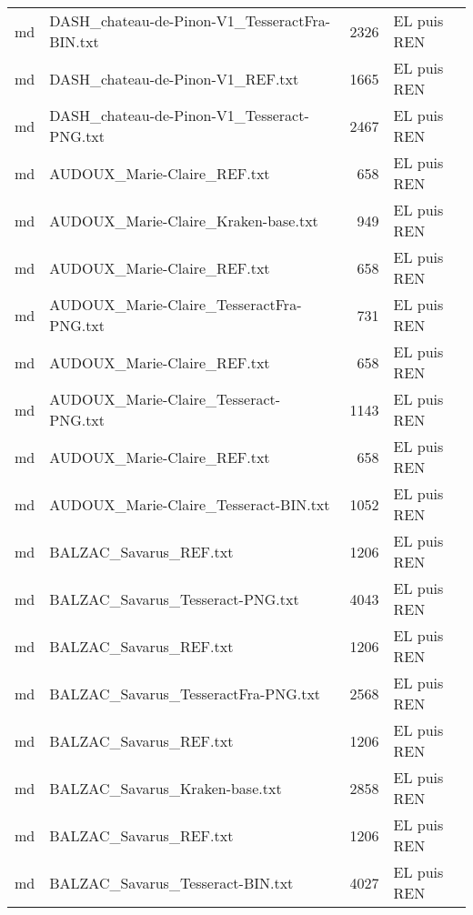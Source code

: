 \begin{tabular}{llrl}
    md &      DASH\_chateau-de-Pinon-V1\_TesseractFra-BIN.txt &                  2326 & EL puis REN \\
    md &                   DASH\_chateau-de-Pinon-V1\_REF.txt &                  1665 & EL puis REN \\
    md &         DASH\_chateau-de-Pinon-V1\_Tesseract-PNG.txt &                  2467 & EL puis REN \\
    md &                        AUDOUX\_Marie-Claire\_REF.txt &                   658 & EL puis REN \\
    md &                AUDOUX\_Marie-Claire\_Kraken-base.txt &                   949 & EL puis REN \\
    md &                        AUDOUX\_Marie-Claire\_REF.txt &                   658 & EL puis REN \\
    md &           AUDOUX\_Marie-Claire\_TesseractFra-PNG.txt &                   731 & EL puis REN \\
    md &                        AUDOUX\_Marie-Claire\_REF.txt &                   658 & EL puis REN \\
    md &              AUDOUX\_Marie-Claire\_Tesseract-PNG.txt &                  1143 & EL puis REN \\
    md &                        AUDOUX\_Marie-Claire\_REF.txt &                   658 & EL puis REN \\
    md &              AUDOUX\_Marie-Claire\_Tesseract-BIN.txt &                  1052 & EL puis REN \\
    md &                             BALZAC\_Savarus\_REF.txt &                  1206 & EL puis REN \\
    md &                   BALZAC\_Savarus\_Tesseract-PNG.txt &                  4043 & EL puis REN \\
    md &                             BALZAC\_Savarus\_REF.txt &                  1206 & EL puis REN \\
    md &                BALZAC\_Savarus\_TesseractFra-PNG.txt &                  2568 & EL puis REN \\
    md &                             BALZAC\_Savarus\_REF.txt &                  1206 & EL puis REN \\
    md &                     BALZAC\_Savarus\_Kraken-base.txt &                  2858 & EL puis REN \\
    md &                             BALZAC\_Savarus\_REF.txt &                  1206 & EL puis REN \\
    md &                   BALZAC\_Savarus\_Tesseract-BIN.txt &                  4027 & EL puis REN \\

\end{tabular}
